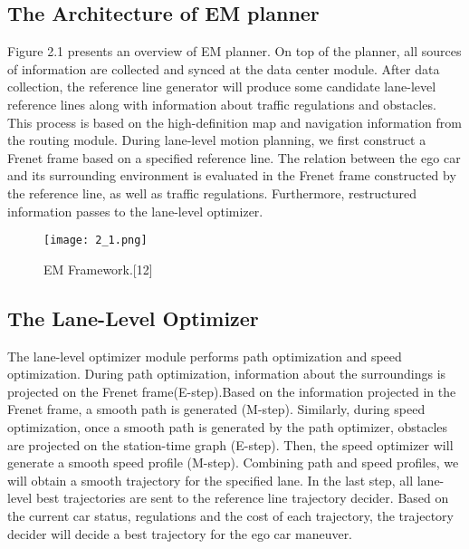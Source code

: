 \documentclass{thesisreport}
\begin{document}
 \subsection{The Architecture of EM planner}
 Figure 2.1 presents an overview of EM planner. On top of the planner, all sources of information are collected and synced at the data center module. After data collection, the reference line generator will produce some candidate lane-level reference lines along with information about traffic regulations and obstacles. This process is based on the high-definition map and navigation information from the routing module. During lane-level motion planning, we first construct a Frenet frame based on a specified reference line. The relation between the ego car and its surrounding environment is evaluated in the Frenet frame constructed by the reference line, as well as traffic regulations. Furthermore, restructured information passes to the lane-level optimizer.
    \begin{figure}[ht]
 	\centering
 	\texttt{[image: 2\_1.png]}
 	\caption{EM Framework.[12]}
 	\label{fig:2.1} 
 \end{figure}

\subsection{The Lane-Level Optimizer}
The lane-level optimizer module performs path optimization and speed optimization. During path optimization, information about the surroundings is projected on the Frenet frame(E-step).Based on the information projected in the Frenet frame, a smooth path is generated (M-step). Similarly, during speed optimization, once a smooth path is generated by the path optimizer, obstacles are projected on the station-time graph (E-step). Then, the speed optimizer will generate a smooth speed profile (M-step). Combining path and speed profiles, we will obtain a smooth trajectory for the specified lane. In the last step, all lane-level best trajectories are sent to the reference line trajectory decider. Based on the current car status, regulations and the cost of each trajectory, the trajectory decider will decide a best trajectory for the ego car maneuver.
 
 
\end{document}

